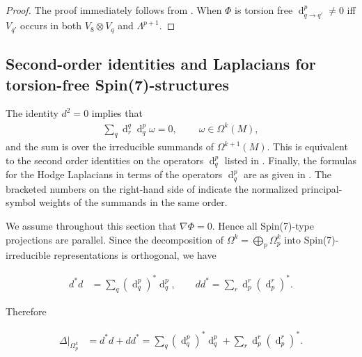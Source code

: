 \documentclass[10pt,a4paper,reqno]{article}
\theoremstyle{definition}
\numberwithin{equation}{section}
\DeclareMathOperator{\dd}{d}
\begin{document}
\begin{proof}
The proof immediately follows from . When $\Phi$ is torsion free $\dd^p_{q\to q'}\neq0$ iff $V_{q'}$ occurs in both $V_8\otimes V_q$ and $\Lambda^{p+1}$.
\end{proof}


\subsection{Second-order identities and Laplacians for torsion-free Spin(7)-structures}

The identity $d^2 = 0$ implies that
\begin{align*}
\sum_{q}\dd^{q}_r\dd^p_q \omega=0,\ \qquad \omega\in \Omega^k(M),
\end{align*}
and the sum is over the irreducible summands of $\Omega^{k+1}(M)$. This is equivalent to the second order identities on the operators $\dd^p_q$
listed in . Finally, the formulas for the Hodge Laplacians in terms of the operators $\dd^p_q$ are as given in . The bracketed numbers on the right-hand side of  indicate the normalized principal-symbol weights of the summands in the same order.


We assume throughout this section that \(\nabla\Phi=0\). Hence all Spin(7)-type
projections are parallel. Since the decomposition of $\Omega^k=\bigoplus_{p}\Omega^k_p$ into Spin(7)-irreducible representations is orthogonal, we have

\begin{align*}
    d^*d&=\sum_q (\dd^p_q)^*\dd^p_q,\qquad dd^*=\sum_r \dd^r_p(\dd^r_p)^*.
\end{align*}

\noindent
Therefore

\begin{align}\label{eqn:laplacian_decomp}
    \Delta|_{\Omega^k_p}&=d^*d+dd^*=\sum_q (\dd^p_q)^*\dd^p_q+\sum_r \dd^r_p(\dd^r_p)^*.
\end{align}
\end{document}

